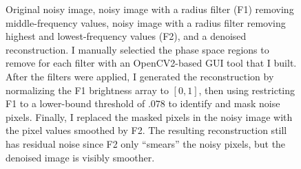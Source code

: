 \documentclass[12pt]{article}
\begin{document}
\begin{figure}[h!]
    \caption{Original noisy image, noisy image with a radius filter (F1) removing middle-frequency values, noisy image with a radius filter removing highest and lowest-frequency values (F2), and a denoised reconstruction. I manually selectied the phase space regions to remove for each filter with an OpenCV2-based GUI tool that I built. After the filters were applied, I generated the reconstruction by normalizing the F1 brightness array to $[0,1]$, then using restricting F1 to a lower-bound threshold of $.078$ to identify and mask noise pixels. Finally, I replaced the masked pixels in the noisy image with the pixel values smoothed by F2. The resulting reconstruction still has residual noise since F2 only ``smears'' the noisy pixels, but the denoised image is visibly smoother.}
    \label{p11_fc}
\end{figure}
\end{document}

